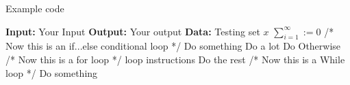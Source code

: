 \documentclass{article}
\newcommand{\codeComment}[1]{\textcolor{codeblue}{#1}}
\begin{document}
\begin{algorithm}
\caption{Example code}
\begin{algorithmic}[1]
\Statex \textbf{Input:} Your Input
\Statex \textbf{Output:} Your output
\Statex \textbf{Data:} Testing set $x$
\State $\sum_{i=1}^{\infty} := 0$ \Comment{\codeComment{// this is a comment}}
\State \codeComment{/* Now this is an if...else conditional loop */}
    \State Do something \Comment{\codeComment{// this is another comment}}
        \State Do a lot
    \EndIf
{}
    \State Do Otherwise
    \State \codeComment{/* Now this is a for loop */}
        \State loop instructions
    \EndFor
\Else
    \State Do the rest
    \State \codeComment{/* Now this is a While loop */}
        \State Do something
    \EndWhile
\EndIf
\end{algorithmic}
\end{algorithm}
\end{document}
